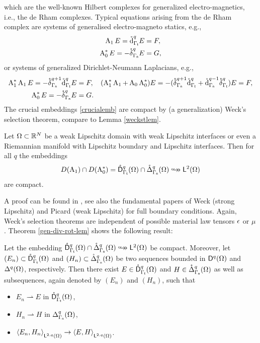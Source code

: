 \documentclass[a4paper]{amsart}
\newcommand{\wto}{\rightharpoonup}
\renewcommand{\dc}{\mathring\dsymbol}
\renewcommand{\dcgat}{\dc_{\gat}}
\DeclareMathOperator{\Azs}{A_{0}^{*}}
\DeclareMathOperator{\Ao}{A_{1}}
\newcommand{\cptemb}{\hookto\hspace*{-0.85em}\hookto}
\begin{document}
which are the well-known Hilbert complexes for generalized electro-magnetics, i.e.,
the de Rham complexes. 
Typical equations arising from the de Rham complex are
systems of generalised electro-magneto statics, e.g.,
\begin{align*}
\operatorname{A}_{1}E=\mathring{\operatorname{d}}_{\Gamma_{\mathsf{t}}}^{q}E&=F,\\
\operatorname{A}_{0}^{*}E=-\mathring{\operatorname{\delta}}_{\Gamma_{\mathsf{n}}}^{q}E&=G,
\end{align*}
or systems of generalized Dirichlet-Neumann Laplacians, e.g.,
\begin{align*}
\operatorname{A}_{1}^{*}\operatorname{A}_{1}E=-\mathring{\operatorname{\delta}}_{\Gamma_{\mathsf{n}}}^{q+1}\mathring{\operatorname{d}}_{\Gamma_{\mathsf{t}}}^{q}E&=F,
&
(\operatorname{A}_{1}^{*}\operatorname{A}_{1}+\operatorname{A}_{0}\operatorname{A}_{0}^{*})E
=-(\mathring{\operatorname{\delta}}_{\Gamma_{\mathsf{n}}}^{q+1}\mathring{\operatorname{d}}_{\Gamma_{\mathsf{t}}}^{q}+\mathring{\operatorname{d}}_{\Gamma_{\mathsf{n}}}^{q-1}\mathring{\operatorname{\delta}}_{\Gamma_{\mathsf{t}}}^{q})E&=F,\\
\operatorname{A}_{0}^{*}E=-\mathring{\operatorname{\delta}}_{\Gamma_{\mathsf{n}}}^{q}E&=G.
\end{align*}
The crucial embeddings \eqref{crucialemb}
are compact by (a generalization) Weck's selection theorem, compare to Lemma \ref{weckstlem}.

\begin{lem}
\label{weckstqlem}
Let $\Omega\subset\mathbb{R}^{N}$ be a weak Lipschitz domain with weak Lipschitz interfaces
or even a Riemannian manifold with Lipschitz boundary and Lipschitz interfaces.
Then for all $q$ the embeddings
$$D(\Ao)\cap D(\Azs)=\dcgat^{q}(\om)\cap\mathring\Delta^{q}_{\gan}(\om)\cptemb\ltom$$
are compact.
\end{lem}

A proof can be found in \cite[Theorem 4.9]{bauerpaulyschomburg2017},
see also the fundamental papers of Weck \cite{weckmax} (strong Lipschitz) 
and Picard \cite{picardcomimb} (weak Lipschitz) for full boundary conditions.
Again, Weck's selection theorems are independent of possible material law tensors $\epsilon$ or $\mu$.
Theorem \ref{gen-div-rot-lem} shows the following result:

\begin{theo}
Let the embedding $\dcgat^{q}(\om)\cap\mathring\Delta^{q}_{\gan}(\om)\cptemb\ltom$ be compact.
Moreover, let $(E_{n})\subset\dcgat^{q}(\om)$ and $(H_{n})\subset\mathring\Delta^{q}_{\Gamma_{\mathsf{n}}}(\Omega)$
be two sequences bounded in $\overset{}{\mathsf{D}}{}^{q}_{}(\Omega)$ and $\Delta^{q}(\Omega)$, respectively.
Then there exist $E\in\dcgat^{q}(\om)$ and $H\in\mathring\Delta^{q}_{\Gamma_{\mathsf{n}}}(\Omega)$ 
as well as subsequences, again denoted by $(E_{n})$ and $(H_{n})$, 
such that 
\begin{itemize}
\item
$E_{n}\wto E$ in $\dcgat^{q}(\om)$,
\item
$H_{n}\wto H$ in $\Delta^{q}_{\Gamma_{\mathsf{n}}}(\Omega)$,
\item
$\langle E_{n},H_{n}\rangle_{\overset{}{\mathsf{L}}{}^{2,q}_{}(\Omega)}\to\langle E,H\rangle_{\overset{}{\mathsf{L}}{}^{2,q}_{}(\Omega)}$.
\end{itemize}
\end{theo}
\end{document}
